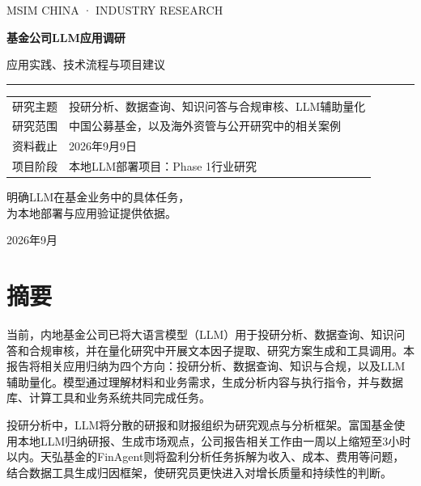 \documentclass[11pt,a4paper,fontset=none]{ctexart}
\begin{document}
\hypersetup{pageanchor=false}
\begin{titlepage}
\thispagestyle{empty}\setlength{\parindent}{0pt}
\vspace*{18mm}
{\sffamily\large\color{teal}MSIM CHINA · INDUSTRY RESEARCH\par}
\vspace{18mm}
{\Huge\bfseries\color{navy}基金公司LLM应用调研\par}
\vspace{8mm}
{\Large\color{muted}应用实践、技术流程与项目建议\par}
\vspace{15mm}\textcolor{teal}{\rule{\linewidth}{2pt}}\vspace{9mm}
\begin{tabularx}{\linewidth}{@{}P{28mm}Y@{}}
研究主题 & 投研分析、数据查询、知识问答与合规审核、LLM辅助量化\\
研究范围 & 中国公募基金，以及海外资管与公开研究中的相关案例\\
资料截止 & 2026年9月9日\\
项目阶段 & 本地LLM部署项目：Phase 1行业研究\\
\end{tabularx}
\vfill
{\large\color{navy}明确LLM在基金业务中的具体任务，\\[4pt]为本地部署与应用验证提供依据。\par}
\vspace{15mm}
{\small\color{muted}2026年9月\par}
\end{titlepage}
\hypersetup{pageanchor=true}

\section*{摘要}
当前，内地基金公司已将大语言模型（LLM）用于投研分析、数据查询、知识问答和合规审核，并在量化研究中开展文本因子提取、研究方案生成和工具调用。本报告将相关应用归纳为四个方向：投研分析、数据查询、知识与合规，以及LLM辅助量化。模型通过理解材料和业务需求，生成分析内容与执行指令，并与数据库、计算工具和业务系统共同完成任务。

投研分析中，LLM将分散的研报和财报组织为研究观点与分析框架。富国基金使用本地LLM归纳研报、生成市场观点，公司报告相关工作由一周以上缩短至3小时以内。天弘基金的FinAgent则将盈利分析任务拆解为收入、成本、费用等问题，结合数据工具生成归因框架，使研究员更快进入对增长质量和持续性的判断。
\end{document}
